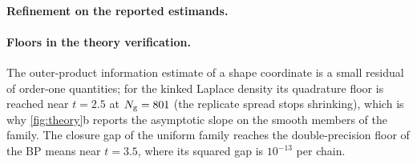 \paragraph{Refinement on the reported estimands.}

\paragraph{Floors in the theory verification.}
The outer-product information estimate of a shape coordinate is a small residual of
order-one quantities; for the kinked Laplace density its quadrature floor is reached
near $t=2.5$ at $N_{\mathrm{g}}=801$ (the replicate spread stops shrinking), which is why
\cref{fig:theory}b reports the asymptotic slope on the smooth members of the family. The
closure gap of the uniform family reaches the double-precision floor of the BP means
near $t=3.5$, where its squared gap is $10^{-13}$ per chain.
